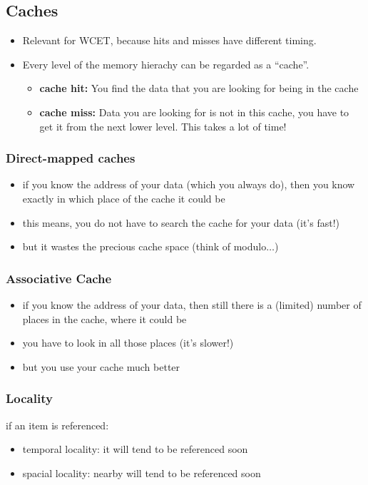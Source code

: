 \documentclass[german]{latex4ei/latex4ei_sheet}
\begin{document}
\begin{sectionbox}
\subsection{Caches}
\begin{itemize}
\item Relevant for WCET, because hits and misses have different timing.
\item Every level of the memory hierachy can be regarded as a "`cache"'.
\begin{itemize}
\item \textbf{cache hit:} You find the data that you are looking for being in the cache
\item \textbf{cache miss:} Data you are looking for is not in this cache, you have to get it from the next lower level. This takes a lot of time!
\end{itemize}
\end{itemize}

\subsubsection{Direct-mapped caches}
\begin{itemize}
\item if you know the address of your data (which you always do), then you know exactly in which place of the cache it could be
\item this means, you do not have to search the cache for your data (it's fast!)
\item but it wastes the precious cache space (think of modulo$\ldots$)
\end{itemize}

\subsubsection{Associative Cache}
\begin{itemize}
\item if you know the address of your data, then still there is a (limited) number of places in the cache, where it could be
\item you have to look in all those places (it's slower!)
\item but you use your cache much better
\end{itemize}

\subsubsection{Locality}
if an item is referenced:
\begin{itemize}
\item temporal locality: it will tend to be referenced soon
\item spacial locality: nearby will tend to be referenced soon
\end{itemize}


\end{sectionbox}
\end{document}
